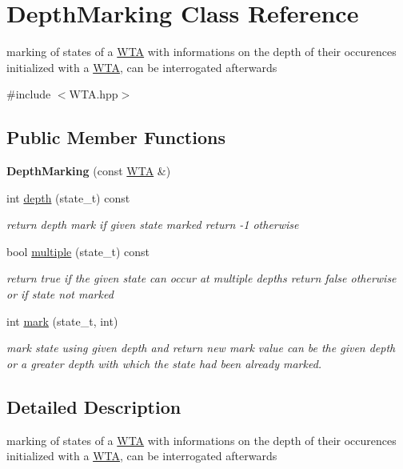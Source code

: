 \hypertarget{classDepthMarking}{}\section{Depth\+Marking Class Reference}
\label{classDepthMarking}


marking of states of a \mbox{\hyperlink{classWTA}{W\+TA}} with informations on the depth of their occurences initialized with a \mbox{\hyperlink{classWTA}{W\+TA}}, can be interrogated afterwards  




{\ttfamily \#include $<$W\+T\+A.\+hpp$>$}

\subsection*{Public Member Functions}
\begin{DoxyCompactItemize}
\item 
{\bfseries Depth\+Marking} (const \mbox{\hyperlink{classWTA}{W\+TA}} \&)
\item 
int \mbox{\hyperlink{group__schemata_gaaa84e1d149651938af82e47b91888017}{depth}} (state\+\_\+t) const
\begin{DoxyCompactList}\small\item\em return depth mark if given state marked return -\/1 otherwise \end{DoxyCompactList}\item 
bool \mbox{\hyperlink{group__schemata_gad5f3fa885bb5d2be624a26e9aa50dd0b}{multiple}} (state\+\_\+t) const
\begin{DoxyCompactList}\small\item\em return true if the given state can occur at multiple depths return false otherwise or if state not marked \end{DoxyCompactList}\item 
int \mbox{\hyperlink{group__schemata_ga3486fcb9921f3c018b931e088a53df7d}{mark}} (state\+\_\+t, int)
\begin{DoxyCompactList}\small\item\em mark state using given depth and return new mark value can be the given depth or a greater depth with which the state had been already marked. \end{DoxyCompactList}\end{DoxyCompactItemize}


\subsection{Detailed Description}
marking of states of a \mbox{\hyperlink{classWTA}{W\+TA}} with informations on the depth of their occurences initialized with a \mbox{\hyperlink{classWTA}{W\+TA}}, can be interrogated afterwards 

